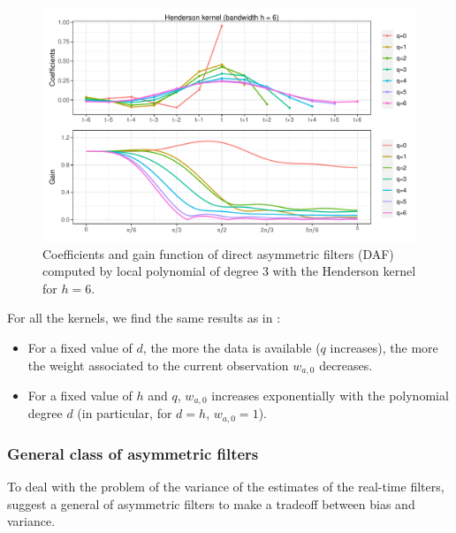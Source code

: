 \documentclass[
  12pt,
  ,
  a4paper]{article}
\newcommand\1{\mathds{1}}
\begin{document}
\begin{figure}[!ht]
\includegraphics[width=\textwidth]{img/daf/coef_gain_1}
\caption{Coefficients and gain function of direct asymmetric filters (DAF) computed by local polynomial of degree $3$ with the Henderson kernel for $h=6$.}\label{fig:filtersdafcoefs}\footnotesize
\end{figure}

For all the kernels, we find the same results as in \textcite{proietti2008}:

\begin{itemize}
\item
  For a fixed value of \(d\), the more the data is available (\(q\) increases), the more the weight associated to the current observation \(w_{a,0}\) decreases.
\item
  For a fixed value of \(h\) and \(q\), \(w_{a,0}\) increases exponentially with the polynomial degree \(d\) (in particular, for \(d=h\), \(w_{a,0}=1\)).
\end{itemize}

\hypertarget{subsec:lppasymf}{%
\subsubsection{General class of asymmetric filters}\label{subsec:lppasymf}}

To deal with the problem of the variance of the estimates of the real-time filters, \textcite{proietti2008} suggest a general of asymmetric filters to make a tradeoff between bias and variance.
\end{document}
